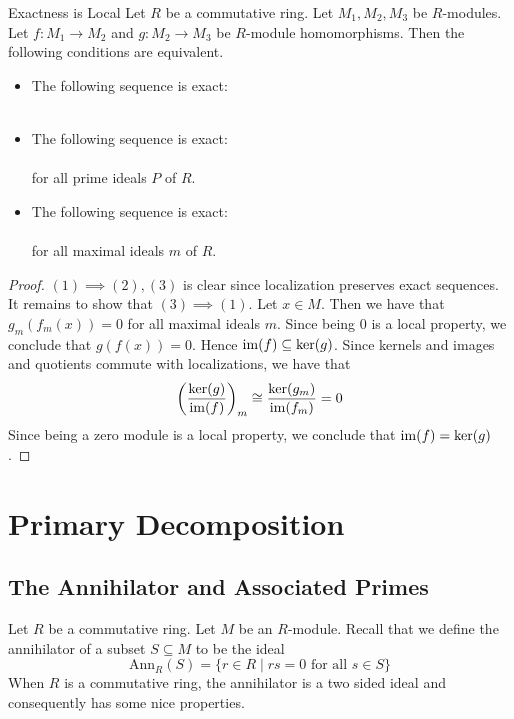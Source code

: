 \documentclass[a4paper]{article}
\begin{document}
\begin{prp}{Exactness is Local}{} Let $R$ be a commutative ring. Let $M_1,M_2,M_3$ be $R$-modules. Let $f:M_1\to M_2$ and $g:M_2\to M_3$ be $R$-module homomorphisms. Then the following conditions are equivalent. 
\begin{itemize}
\item The following sequence is exact: \\
\\
\item The following sequence is exact: \\
\\
for all prime ideals $P$ of $R$. 
\item The following sequence is exact: \\
\\
for all maximal ideals $m$ of $R$. 
\end{itemize} 
\begin{proof}
$(1)\implies(2),(3)$ is clear since localization preserves exact sequences. It remains to show that $(3)\implies(1)$. Let $x\in M$. Then we have that $g_m(f_m(x))=0$ for all maximal ideals $m$. Since being $0$ is a local property, we conclude that $g(f(x))=0$. Hence $\operatorname{im}(f)\subseteq\ker(g)$. Since kernels and images and quotients commute with localizations, we have that $$\left(\frac{\ker(g)}{\operatorname{im}(f)}\right)_m\cong\frac{\ker(g_m)}{\operatorname{im}(f_m)}=0$$ Since being a zero module is a local property, we conclude that $\operatorname{im}(f)=\ker(g)$. 
\end{proof}
\end{prp}

\pagebreak
\section{Primary Decomposition}
\subsection{The Annihilator and Associated Primes}
Let $R$ be a commutative ring. Let $M$ be an $R$-module. Recall that we define the annihilator of a subset $S\subseteq M$ to be the ideal $$\text{Ann}_R(S)=\{r\in R\;|\;rs=0\text{ for all }s\in S\}$$ When $R$ is a commutative ring, the annihilator is a two sided ideal and consequently has some nice properties. 
\end{document}
